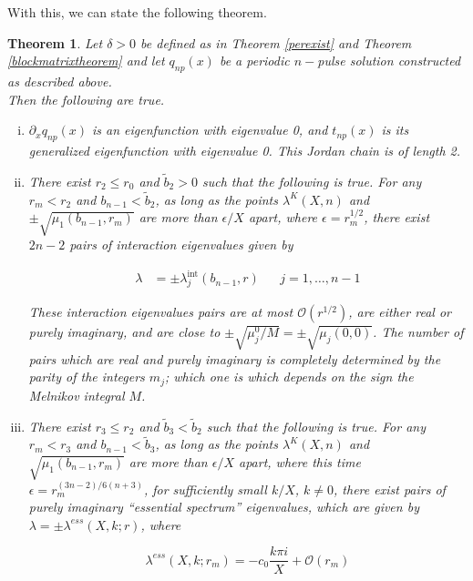 \documentclass[12pt]{article}
\newtheorem{theorem}{Theorem}
\begin{document}
With this, we can state the following theorem.

\begin{theorem}
Let $\delta > 0$ be defined as in Theorem \ref{perexist} and Theorem \ref{blockmatrixtheorem} and let $q_{np}(x)$ be a periodic $n-$pulse solution constructed as described above.\\

Then the following are true.

\begin{enumerate}[(i)]

\item $\partial_x q_{np}(x)$ is an eigenfunction with eigenvalue 0, and $t_{np}(x)$ is its generalized eigenfunction with eigenvalue 0. This Jordan chain is of length 2.

\item There exist $r_2 \leq r_0$ and $\tilde{b}_2 > 0$ such that the following is true. For any $r_m < r_2$ and $b_{n-1} < \tilde{b}_2$, as long as the points $\lambda^K(X,n)$ and $\pm \sqrt{\mu_1(b_{n-1}, r_m)}$ are more than $\epsilon/X$ apart, where $\epsilon = r_m^{1/2}$, there exist $2n - 2$ pairs of interaction eigenvalues given by

\begin{align*}
\lambda &= \pm \lambda^{\text{int}}_j(b_{n-1}, r) && j = 1, \dots, n-1
\end{align*}

These interaction eigenvalues pairs are at most $\mathcal{O}(r^{1/2})$, are either real or purely imaginary, and are close to $\pm \sqrt{\mu_j^0 / M} = \pm \sqrt{\mu_j(0, 0)}$. The number of pairs which are real and purely imaginary is completely determined by the parity of the integers $m_j$; which one is which depends on the sign the Melnikov integral $M$.

\item There exist $r_3 \leq r_2$ and $\tilde{b}_3 < \tilde{b}_2$ such that the following is true. For any $r_m < r_3$ and $b_{n-1} < \tilde{b}_3$, as long as the points $\lambda^K(X,n)$ and $\sqrt{\mu_1(b_{n-1}, r_m)}$ are more than $\epsilon/X$ apart, where this time $\epsilon = r_m^{(3n-2)/6(n+3)}$, for sufficiently small $k/X$, $k \neq 0$, there exist pairs of purely imaginary ``essential spectrum'' eigenvalues, which are given by $\lambda = \pm \lambda^{ess}(X, k; r)$, where

\begin{equation}\label{essspeceigs}
\lambda^{ess}(X, k; r_m) = -c_0 \frac{k \pi i}{X} + \mathcal{O}\left(r_m\right)
\end{equation}


\end{enumerate}
\end{theorem}
\end{document}
